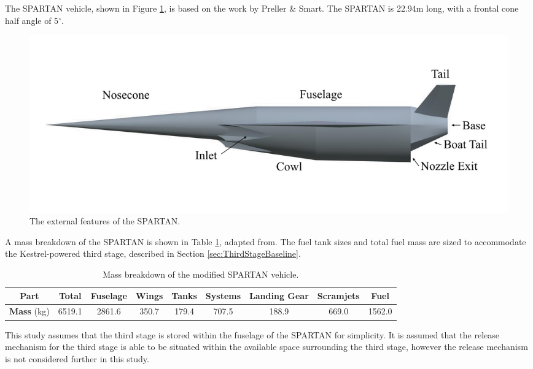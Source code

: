 		The SPARTAN vehicle, shown in Figure \ref{fig:SPARTANlabelled}, is based on the work by Preller \& Smart\cite{Preller2017b}. The SPARTAN is 22.94m long, with a frontal cone half angle of 5$^\circ$\cite{Preller2017b}. 
		\begin{figure}[ht]
			\centering
			\includegraphics[width=0.7\linewidth]{figures/3_vehicle_design/SPARTANlabelled}
			\caption{The external features of the SPARTAN.}
			\label{fig:SPARTANlabelled}
		\end{figure}
		A mass breakdown of the SPARTAN is shown in Table \ref{tab:MassBreakdown}, adapted from\cite{Preller2017b}. The fuel tank sizes and total fuel mass are sized to accommodate the Kestrel-powered third stage, described in Section \ref{sec:ThirdStageBaseline}.
		\begin{table}[h]
		\begin{tabular}{|c|c|c|c|c|c|c|c|c|}
			\hline  \textbf{Part} & Total & Fuselage & Wings & Tanks & Systems & Landing Gear & Scramjets & Fuel \\ 
			\hline \textbf{Mass} (kg) & 6519.1 & 2861.6 & 350.7 & 179.4 & 707.5 & 188.9 & 669.0 & 1562.0 \\ 
			\hline 
		\end{tabular} 
		\caption{Mass breakdown of the modified SPARTAN vehicle.}
		\label{tab:MassBreakdown}
		\end{table}
This study assumes that the third stage is stored within the fuselage of the SPARTAN for simplicity. It is assumed that the release mechanism for the third stage is able to be situated within the available space surrounding the third stage, however the release mechanism is not considered further in this study. 
		
		

